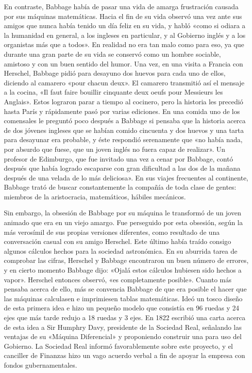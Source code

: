 \documentclass[a4paper, 12pt]{article}
\begin{document}
En contraste, Babbage había de pasar una vida de amarga frustración causada por sus máquinas matemáticas. Hacia el fin de su vida observó una vez ante sus amigos que nunca había tenido un día feliz en su vida, y habló «como si odiara a la humanidad en general, a los ingleses en particular, y al Gobierno inglés y a los organistas más que a todos». En realidad no era tan malo como para eso, ya que durante una gran parte de su vida se conservó como un hombre sociable, amistoso y con un buen sentido del humor. Una vez, en una visita a Francia con Herschel, Babbage pidió para desayuno dos huevos para cada uno de ellos, diciendo al camarero «pour chacun deux». El camarero transmitió así el mensaje a la cocina, «Il faut faire bouillir cinquante deux oeufs pour Messieurs les Anglais». Estos lograron parar a tiempo al cocinero, pero la historia les precedió hasta París y rápidamente pasó por varias ediciones. En una comida uno de los comensales le preguntó poco después a Babbage si pensaba que la historia acerca de dos jóvenes ingleses que se habían comido cincuenta y dos huevos y una tarta para desayunar era probable, y éste respondió serenamente que «no había nada, por absurdo que fuese, que un joven inglés no fuera capaz de realizar». Un profesor de Edimburgo, que  fue invitado una vez a cenar por Babbage, contó después que había logrado escaparse con gran dificultad a las dos de la mañana después de una velada de lo más deliciosa». En sus viajes frecuentes al continente, Babbage trató de buscar constantemente la compañía de toda clase de gentes: miembros de la aristocracia, matemáticos, hábiles mecánicos.

Sin embargo, la obsesión de Babbage por su máquina le transformó de un joven animado que era en un viejo amargo. Fue perseguido por esta obsesión, según la más verosímil de sus propias versiones diferentes, como resultado de una conversación casual con su amigo Herschel. Este último había traído consigo algunos cálculos hechos para la sociedad astronómica. En su aburrida tarea de comprobar las cifras, Herschel y Babbage encontraron un buen número de errores, y en cierto momento Babbage dijo: «Ojalá estos cálculos hubiesen sido hechos a vapor». Herschel entonces observó, «es completamente posible». Cuanto más pensaba acerca de ello, más se convencia Babbage de que era posible el hacer que las máquinas calculasen e imprimiesen tablas matemáticas. Ideó un tosco diseño de esta primera idea e hizo un pequeño modelo que consistía en 96 ruedas y 24 ejes que más tarde redujo a 18 ruedas y 3 ejes. En 1822 escribió una carta acerca de esta idea a Sir Humphry Davy, presidente de la Sociedad Real, señalando las ventajas de su «Máquina Diferencial» y proponiendo construir una para uso del Gobierno. La Sociedad Real informó favorablemente sobre este proyecto, y el canciller de Finanzas hizo un vago acuerdo verbal a fin de apoyar la empresa con fondos gubernamentales.
\end{document}
